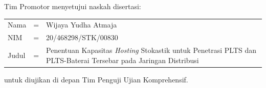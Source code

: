 {}
\vspace*{8pt}

\BgThispage

\noindent Tim Promotor menyetujui naskah disertasi:
\vspace*{-8pt}
{
\begin{longtable}{llp{340pt}}
	\hspace*{-6pt}Nama						& = & Wijaya Yudha Atmaja\\
	\hspace*{-6pt}NIM							& = & 20/468298/STK/00830\\
	\hspace*{-6pt}Judul	& = & Penentuan Kapasitas \textit{Hosting} Stokastik untuk Penetrasi PLTS dan PLTS-Baterai Tersebar pada Jaringan Distribusi
\end{longtable}
}
\vspace*{-22pt}
\noindent untuk diujikan di depan Tim Penguji Ujian Komprehensif.
\vspace*{5cm}

